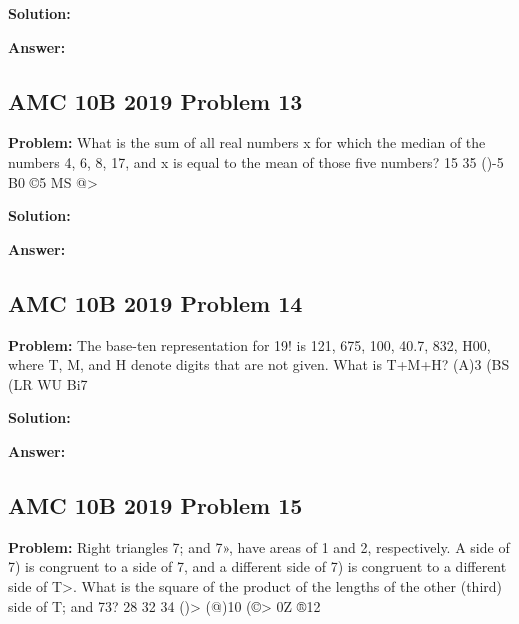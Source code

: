 \documentclass{article}
\newenvironment{problem}{\textbf{Problem: }}{\\}
\newenvironment{solution}{\textbf{Solution: }}{\\}
\newenvironment{answer}{\textbf{Answer: }}{\\}
\begin{document}
\begin{solution}
\end{solution}

\begin{answer}
\end{answer}

\subsection{AMC 10B 2019 Problem 13}

\begin{problem}
What is the sum of all real numbers x for which the median of the numbers 4, 6, 8, 17, and x is equal to the mean of those five numbers? 15 35 ()-5 B0 ©5 MS @>
\end{problem}

\begin{solution}
\end{solution}

\begin{answer}
\end{answer}

\subsection{AMC 10B 2019 Problem 14}

\begin{problem}
The base-ten representation for 19! is 121, 675, 100, 40.7, 832, H00, where T, M, and H denote digits that are not given. What is T+M+H? (A)3 (BS (LR WU Bi7
\end{problem}

\begin{solution}
\end{solution}

\begin{answer}
\end{answer}

\subsection{AMC 10B 2019 Problem 15}

\begin{problem}
Right triangles 7; and 7», have areas of 1 and 2, respectively. A side of 7) is congruent to a side of 7, and a different side of 7) is congruent to a different side of T>. What is the square of the product of the lengths of the other (third) side of T; and 73? 28 32 34 ()> (@)10 (©> 0Z ®12
\end{problem}
\end{document}
